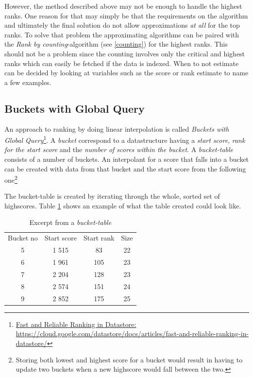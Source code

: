 However, the method described above may not be enough to handle the highest ranks. One reason for that may simply be that the requirements on the algorithm and ultimately the final solution do not allow approximations \emph{at all} for the top ranks. To solve that problem the approximating algorithms can be paired with the \emph{Rank by counting}-algorithm (see \cref{counting}) for the highest ranks. This should not be a problem since  the counting involves only the critical and highest ranks which can easily be fetched if the data is indexed. When to not estimate can be decided by looking at variables such as the score or rank estimate to name a few examples.


\subsection{\label{bucket}Buckets with Global Query}

An approach to ranking by doing linear interpolation is called \emph{Buckets with Global Query}\footnote{\href{https://cloud.google.com/datastore/docs/articles/fast-and-reliable-ranking-in-datastore/}{Fast and Reliable Ranking in Datastore:\\ https://cloud.google.com/datastore/docs/articles/fast-and-reliable-ranking-in-datastore/}}. A \emph{bucket} correspond to a datastructure having a \emph{start score}, \emph{rank for the start score} and the \emph{number of scores within the bucket}. A \emph{bucket-table} consists of a number of buckets. An interpolant for a score that falls into a bucket can be created with data from that bucket and the start score from the following one\footnote{Storing both lowest and highest score for a bucket would result in having to update two buckets when a new highscore would fall between the two.}

The bucket-table is created by iterating through the whole, sorted set of highscores. Table \ref{table:ranking-table} shows an example of what the table created could look like.


\begin{table}[h]
  \begin{center}
    \vspace{4mm}
  \begin{tabular}{ c c c c }
    Bucket no & Start score & Start rank & Size \\
    5 & 1 515 & 83 & 22 \\ 
    6 & 1 961 & 105 & 23 \\ 
    7 & 2 204 & 128 & 23 \\ 
    8 & 2 574 & 151 & 24 \\  
    9 & 2 852 & 175 & 25 \\ 
  \end{tabular} 
  \caption{Excerpt from a \emph{bucket-table}}
  \label{table:ranking-table}
  \end{center} 
\end{table}

